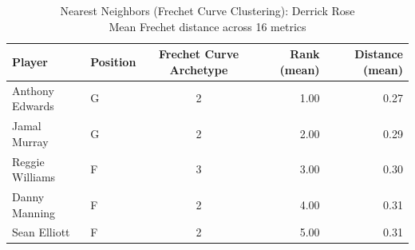 \begin{table}[t]
\caption*{
{\fontsize{20}{25} Nearest Neighbors (Frechet Curve Clustering): Derrick Rose\fontsize{12}{15}\selectfont } \\ 
{\fontsize{14}{17}\selectfont  Mean Frechet distance across 16 metrics\fontsize{12}{15}\selectfont }
} 
\fontsize{12.0pt}{14.0pt}\selectfont
\begin{tabular*}{\linewidth}{@{\extracolsep{\fill}}llcrr}
\toprule
Player & Position & Frechet Curve Archetype & Rank (mean) & Distance (mean) \\ 
\midrule\addlinespace[2.5pt]
Anthony Edwards & G & 2 & 1.00 & 0.27 \\ 
Jamal Murray & G & 2 & 2.00 & 0.29 \\ 
Reggie Williams & F & 3 & 3.00 & 0.30 \\ 
Danny Manning & F & 2 & 4.00 & 0.31 \\ 
Sean Elliott & F & 2 & 5.00 & 0.31 \\ 
\bottomrule
\end{tabular*}
\end{table}

